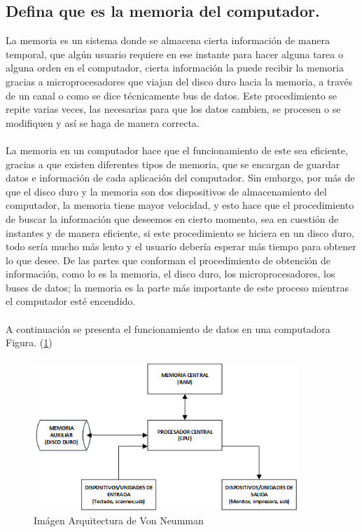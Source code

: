 \documentclass{article}
\begin{document}
\subsection{Defina que es la memoria del computador.}

La memoria es un sistema donde se almacena cierta información de manera temporal, que algún usuario requiere en ese instante para hacer alguna tarea o alguna orden en el computador, cierta información la puede recibir la memoria gracias a microprocesadores que viajan del disco duro hacia la memoria, a través de un canal o como se dice técnicamente bus de datos. Este procedimiento se repite varias veces, las necesarias para que los datos cambien, se procesen o se modifiquen y así se haga de manera correcta.
\paragraph{}
La memoria en un computador hace que el funcionamiento de este sea eficiente, gracias a que existen diferentes tipos de memoria, que se encargan de guardar datos e información de cada aplicación del computador. Sin embargo, por más de que el disco duro y la memoria son dos dispositivos de almacenamiento del computador, la memoria tiene mayor velocidad, y esto hace que el procedimiento de buscar la información que deseemos en cierto momento, sea en cuestión de instantes y de manera eficiente, si este procedimiento se hiciera en un disco duro, todo sería mucho más lento y el usuario debería esperar más tiempo para obtener lo que desee. De las partes que conforman el procedimiento de obtención de información, como lo es la memoria, el disco duro, los microprocesadores, los buses de datos; la memoria es la parte más importante de este proceso mientras el computador esté encendido.

\paragraph{}
A continuación se presenta el funcionamiento de datos en una computadora Figura. (\ref{fig:imagen1})
\paragraph{}

\begin{figure}[h]
\includegraphics[width=10cm]{imagen1.png}
\centering
\caption{Imágen Arquitectura de Von Neumman \cite{img1}}
\label{fig:imagen1}
\end{figure}
\end{document}
